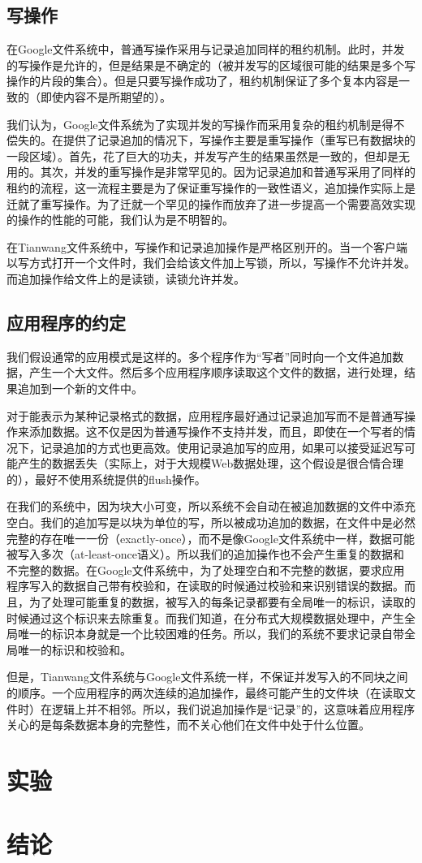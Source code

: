 \documentclass[11pt,a4paper]{scrartcl} %
\begin{document}
\begin{CJK*}{UTF8}{gbsn}
\subsection{写操作}
在Google文件系统中，普通写操作采用与记录追加同样的租约机制。此时，并发的写操作是允许的，但是结果是不确定的（被并发写的区域很可能的结果是多个写操作的片段的集合）。但是只要写操作成功了，租约机制保证了多个复本内容是一致的（即使内容不是所期望的）。

我们认为，Google文件系统为了实现并发的写操作而采用复杂的租约机制是得不偿失的。在提供了记录追加的情况下，写操作主要是重写操作（重写已有数据块的一段区域）。首先，花了巨大的功夫，并发写产生的结果虽然是一致的，但却是无用的。其次，并发的重写操作是非常罕见的。因为记录追加和普通写采用了同样的租约的流程，这一流程主要是为了保证重写操作的一致性语义，追加操作实际上是迁就了重写操作。为了迁就一个罕见的操作而放弃了进一步提高一个需要高效实现的操作的性能的可能，我们认为是不明智的。

在Tianwang文件系统中，写操作和记录追加操作是严格区别开的。当一个客户端以写方式打开一个文件时，我们会给该文件加上写锁，所以，写操作不允许并发。而追加操作给文件上的是读锁，读锁允许并发。
\subsection{应用程序的约定}
我们假设通常的应用模式是这样的。多个程序作为“写者”同时向一个文件追加数据，产生一个大文件。然后多个应用程序顺序读取这个文件的数据，进行处理，结果追加到一个新的文件中。

对于能表示为某种记录格式的数据，应用程序最好通过记录追加写而不是普通写操作来添加数据。这不仅是因为普通写操作不支持并发，而且，即使在一个写者的情况下，记录追加的方式也更高效。使用记录追加写的应用，如果可以接受延迟写可能产生的数据丢失（实际上，对于大规模Web数据处理，这个假设是很合情合理的），最好不使用系统提供的flush操作。


在我们的系统中，因为块大小可变，所以系统不会自动在被追加数据的文件中添充空白。我们的追加写是以块为单位的写，所以被成功追加的数据，在文件中是必然完整的存在唯一一份（exactly-once），而不是像Google文件系统中一样，数据可能被写入多次（at-least-once语义）。所以我们的追加操作也不会产生重复的数据和不完整的数据。在Google文件系统中，为了处理空白和不完整的数据，要求应用程序写入的数据自己带有校验和，在读取的时候通过校验和来识别错误的数据。而且，为了处理可能重复的数据，被写入的每条记录都要有全局唯一的标识，读取的时候通过这个标识来去除重复。而我们知道，在分布式大规模数据处理中，产生全局唯一的标识本身就是一个比较困难的任务。所以，我们的系统不要求记录自带全局唯一的标识和校验和。

但是，Tianwang文件系统与Google文件系统一样，不保证并发写入的不同块之间的顺序。一个应用程序的两次连续的追加操作，最终可能产生的文件块（在读取文件时）在逻辑上并不相邻。所以，我们说追加操作是“记录”的，这意味着应用程序关心的是每条数据本身的完整性，而不关心他们在文件中处于什么位置。

\section{实验}

\section{结论}

\end{CJK*}
\end{document}
